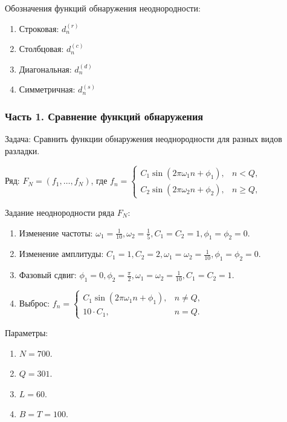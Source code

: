 \documentclass[pdf, 9pt,intlimits, unicode]{beamer}
\begin{document}
\begin{frame}
		{\color{blue} Обозначения функций обнаружения неоднородности:}
		\begin{enumerate}
			\item Строковая: $ d_n^{(r)} $
			
			\item Столбцовая: $ d_n^{(c)} $
			
			\item Диагональная: $ d_n^{(d)} $
			
			\item Симметричная: $ d_n^{(s)} $
		\end{enumerate}
	\end{frame}

	\begin{frame}
		\frametitle{Часть 1. Сравнение функций обнаружения}
		{\color{blue} Задача:} 
		Сравнить функции обнаружения неоднородности для разных видов разладки.
		
		\bigskip
		{\color{blue} Ряд:}
		$ F_N=(f_1, \dots, f_{N}) $, где $f_n = 
		\begin{cases}
			C_1\sin(2\pi\omega_1n + \phi_1),& n < Q, \\
			C_2\sin(2\pi\omega_2n + \phi_2),& n \geq Q,
		\end{cases}$
		
		\bigskip
		
		{\color{blue} Задание неоднородности ряда $ F_N $:}
		\begin{enumerate}
			\item Изменение частоты: $\omega_1 = \frac{1}{10}, \omega_2 = \frac{1}{5}, C_1 = C_2 = 1, \phi_1 = \phi_2 = 0$.
			\item Изменение амплитуды: $ C_1 = 1, C_2 = 2, \omega_1 = \omega_2 = \frac{1}{10}, \phi_1 = \phi_2 = 0 $.
			\item Фазовый сдвиг: $ \phi_1 = 0, \phi_2 = \frac{\pi}{2}, \omega_1 = \omega_2 = \frac{1}{10}, C_1 = C_2 = 1 $.
			\item Выброс: $f_n = 
			\begin{cases}
				C_1\sin(2\pi\omega_1n + \phi_1), & n \neq Q, \\
				10\cdot C_1, & n = Q.
			\end{cases}
			$
		\end{enumerate}
		
		{\color{blue} Параметры:}
		\begin{enumerate}
			\item $ N = 700 $.
			\item $ Q = 301 $.
			\item $ L = 60 $.
			\item $ B = T = 100 $.
		\end{enumerate}
	\end{frame}
	
\end{document}
